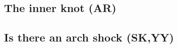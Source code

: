 \subsection{The inner knot (AR)}
\cite{Moran_2015}\cite{rudy2015}\cite{Madsen_2015}
\label{sec:knot}
\subsection{Is there an arch shock (SK,YY)}